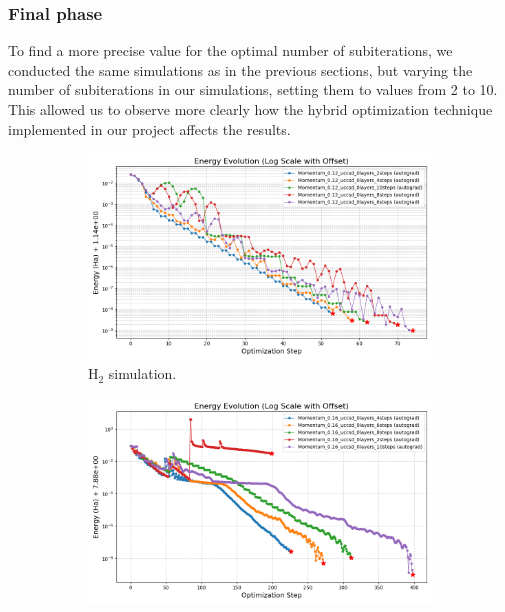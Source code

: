 \subsubsection{Final phase}
To find a more precise value for the optimal number of subiterations, we conducted the same simulations as in the previous sections, but varying the number of subiterations in our simulations, setting them to values from 2 to 10. This allowed us to observe more clearly how the hybrid optimization technique implemented in our project affects the results.

\begin{figure}[H]
  \centering
  \begin{subfigure}{0.45\textwidth}
    \includegraphics[width=\textwidth]{data/NumIterations/final_results_H2/energy_evolution_log_offset.png}
    \caption{H$_2$ simulation.}
    \label{fig:num_iterations_final_h2}
  \end{subfigure}
  \begin{subfigure}{0.45\textwidth}
    \includegraphics[width=\textwidth]{data/NumIterations/final_results_LiH/energy_evolution_log_offset.png}

\end{subfigure}
\end{figure}
